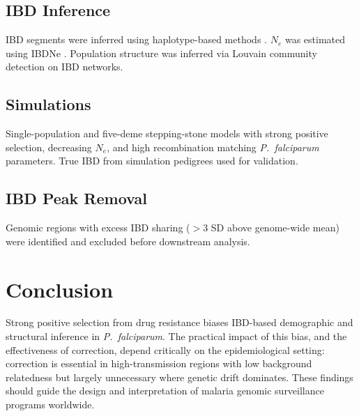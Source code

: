 \documentclass[11pt]{article}
\begin{document}
\subsection{IBD Inference}
IBD segments were inferred using haplotype-based methods \citep{browning2018identity}. $N_e$ was estimated using IBDNe \citep{browning2015ibdne}. Population structure was inferred via Louvain community detection \citep{blondel2008fast} on IBD networks.

\subsection{Simulations}
Single-population and five-deme stepping-stone models with strong positive selection, decreasing $N_e$, and high recombination matching \textit{P.~falciparum} parameters. True IBD from simulation pedigrees used for validation.

\subsection{IBD Peak Removal}
Genomic regions with excess IBD sharing ($>$3 SD above genome-wide mean) were identified and excluded before downstream analysis.

\section{Conclusion}

Strong positive selection from drug resistance biases IBD-based demographic and structural inference in \textit{P.~falciparum}. The practical impact of this bias, and the effectiveness of correction, depend critically on the epidemiological setting: correction is essential in high-transmission regions with low background relatedness but largely unnecessary where genetic drift dominates. These findings should guide the design and interpretation of malaria genomic surveillance programs worldwide.



\end{document}
